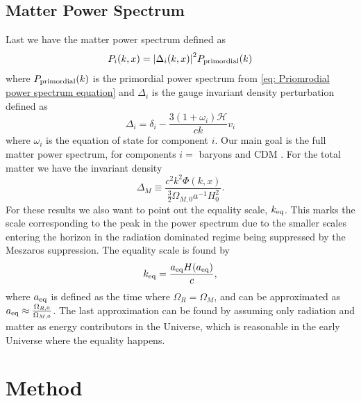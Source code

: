 \documentclass[10pt,a4paper]{article}
\providecommand{\rCDM}
{\ensuremath{
\textrm{CDM}
}
}
\providecommand{\hprime}
{
  \ensuremath{
    \mathcal{H}
  }
}
\begin{document}
\subsection{Matter Power Spectrum}
\label{subsubsec:Theory/Matter power spectrum}
Last we have the matter power spectrum defined as
\begin{equation}
  P_i(k,x) = \abs{\Delta_i(k,x)}^2P_{\rm{primordial}}(k)
  \label{eq: Component matter spectrum}
\end{equation}
where $P_{\rm{primordial}}(k)$ is the primordial power spectrum from \cref{eq: Priomrodial power spectrum equation} and $\Delta_i$ is the gauge invariant density perturbation defined as
\begin{equation}
  \Delta_i = \delta_i - \frac{3(1+\omega_i)\hprime}{ck}v_i
  \label{eq: invariant delta}
\end{equation}
where $\omega_i$ is the equation of state for component $i$. Our main goal is the full matter power spectrum, for components $i=$ baryons and \rCDM. For the total matter we have the invariant density
\begin{equation}
  \Delta_M \equiv \frac{c^2k^2\Phi(k,x)}{\frac{3}{2}\Omega_{M,0}a^{-1}H_0^2}.
  \label{eq: invariant matter delta}
\end{equation}
For these results we also want to point out the equality scale, $k_{\rm{eq}}$. This marks the scale corresponding to the peak in the power spectrum due to the smaller scales entering the horizon in the radiation dominated regime being suppressed by the Meszaros suppression. The equality scale is found by
\begin{equation}
  k_{\rm{eq}} = \frac{a_{\rm{eq}}H(a_{\rm{eq}})}{c},
  \label{eq: k_eq}
\end{equation}
where $a_{\rm{eq}}$ is defined as the time where $\Omega_{R} = \Omega_{M}$, and can be approximated as $a_{\rm{eq}} \approx \frac{\Omega_{R,0}}{\Omega_{M,0}}$. The last approximation can be found by assuming only radiation and matter as energy contributors in the Universe, which is reasonable in the early Universe where the equality happens.

\section{Method}
\label{sec:Method}
\end{document}
